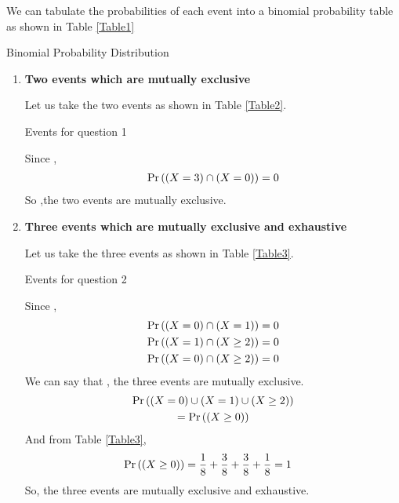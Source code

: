 \documentclass[journal,12pt,twocolumn]{IEEEtran}
\begin{document}
We can tabulate the probabilities of each event into a binomial probability table as shown in Table \ref{Table1}
\begin{table}[ht!]
\def\arraystretch{1.75}
        
        \caption{Binomial Probability Distribution}
        \label{Table1}
    \end{table}

\begin{enumerate}[label=(\roman*)]
    \item 
    \textbf{Two events which are mutually exclusive} 
    
    Let us take the two events as shown in Table \ref{Table2}.
    \begin{table}[ht!]
    \def\arraystretch{1.75}
        
        \caption{Events for question 1}
        \label{Table2}
    \end{table}
    
    Since ,
    \begin{align}
        \Pr\left((X=3) \cap (X=0)\right) = 0
    \end{align}
    So ,the two events are mutually exclusive.
  
    \item \textbf{Three events which are mutually exclusive and exhaustive}
    
    Let us take the three events as shown in Table \ref{Table3}.
    \begin{table}[ht!]
    \def\arraystretch{1.75}
        
        \caption{Events for question 2}
        \label{Table3}
    \end{table}
    
    Since , 
    \begin{align}
        \Pr\left((X=0) \cap (X=1)\right) &= 0 \\
        \Pr\left((X=1) \cap (X \ge 2)\right) &= 0 \\
        \Pr\left((X=0) \cap (X \ge 2)\right) &= 0
    \end{align}
    We can say that , the three events are mutually exclusive. 
    \begin{multline}
        \Pr\left((X=0) \cup (X=1) \cup (X \ge 2)\right) \\ = \Pr\left((X \ge 0)\right)
    \end{multline}
    And from Table \ref{Table3},    
    \begin{align}
        \Pr\left((X \ge 0)\right) &= \dfrac{1}{8}+\dfrac{3}{8}+\dfrac{3}{8}+\dfrac{1}{8} = 1
    \end{align}  
    So, the three events  are mutually exclusive and exhaustive.
    

\end{enumerate}
\end{document}
